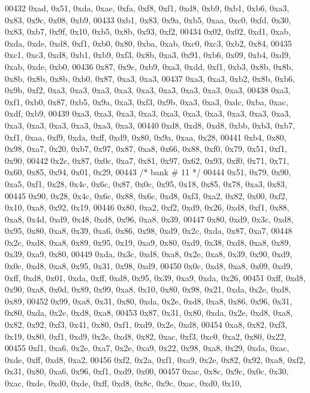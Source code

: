 \begin{DoxyCode}
00432     0xad, 0x51, 0xda, 0xae, 0xfa, 0xf8, 0xf1, 0xd8, 0xb9, 0xb1, 0xb6, 0xa3, 0x83, 0x9c, 0x08, 0xb9,
00433     0xb1, 0x83, 0x9a, 0xb5, 0xaa, 0xc0, 0xfd, 0x30, 0x83, 0xb7, 0x9f, 0x10, 0xb5, 0x8b, 0x93, 0xf2,
00434     0x02, 0x02, 0xd1, 0xab, 0xda, 0xde, 0xd8, 0xf1, 0xb0, 0x80, 0xba, 0xab, 0xc0, 0xc3, 0xb2, 0x84,
00435     0xc1, 0xc3, 0xd8, 0xb1, 0xb9, 0xf3, 0x8b, 0xa3, 0x91, 0xb6, 0x09, 0xb4, 0xd9, 0xab, 0xde, 0xb0,
00436     0x87, 0x9c, 0xb9, 0xa3, 0xdd, 0xf1, 0xb3, 0x8b, 0x8b, 0x8b, 0x8b, 0x8b, 0xb0, 0x87, 0xa3, 0xa3,
00437     0xa3, 0xa3, 0xb2, 0x8b, 0xb6, 0x9b, 0xf2, 0xa3, 0xa3, 0xa3, 0xa3, 0xa3, 0xa3, 0xa3, 0xa3, 0xa3,
00438     0xa3, 0xf1, 0xb0, 0x87, 0xb5, 0x9a, 0xa3, 0xf3, 0x9b, 0xa3, 0xa3, 0xdc, 0xba, 0xac, 0xdf, 0xb9,
00439     0xa3, 0xa3, 0xa3, 0xa3, 0xa3, 0xa3, 0xa3, 0xa3, 0xa3, 0xa3, 0xa3, 0xa3, 0xa3, 0xa3, 0xa3, 0xa3,
00440     0xd8, 0xd8, 0xd8, 0xbb, 0xb3, 0xb7, 0xf1, 0xaa, 0xf9, 0xda, 0xff, 0xd9, 0x80, 0x9a, 0xaa, 0x28,
00441     0xb4, 0x80, 0x98, 0xa7, 0x20, 0xb7, 0x97, 0x87, 0xa8, 0x66, 0x88, 0xf0, 0x79, 0x51, 0xf1, 0x90,
00442     0x2c, 0x87, 0x0c, 0xa7, 0x81, 0x97, 0x62, 0x93, 0xf0, 0x71, 0x71, 0x60, 0x85, 0x94, 0x01, 0x29,
00443     \textcolor{comment}{/* bank # 11 */}
00444     0x51, 0x79, 0x90, 0xa5, 0xf1, 0x28, 0x4c, 0x6c, 0x87, 0x0c, 0x95, 0x18, 0x85, 0x78, 0xa3, 0x83,
00445     0x90, 0x28, 0x4c, 0x6c, 0x88, 0x6c, 0xd8, 0xf3, 0xa2, 0x82, 0x00, 0xf2, 0x10, 0xa8, 0x92, 0x19,
00446     0x80, 0xa2, 0xf2, 0xd9, 0x26, 0xd8, 0xf1, 0x88, 0xa8, 0x4d, 0xd9, 0x48, 0xd8, 0x96, 0xa8, 0x39,
00447     0x80, 0xd9, 0x3c, 0xd8, 0x95, 0x80, 0xa8, 0x39, 0xa6, 0x86, 0x98, 0xd9, 0x2c, 0xda, 0x87, 0xa7,
00448     0x2c, 0xd8, 0xa8, 0x89, 0x95, 0x19, 0xa9, 0x80, 0xd9, 0x38, 0xd8, 0xa8, 0x89, 0x39, 0xa9, 0x80,
00449     0xda, 0x3c, 0xd8, 0xa8, 0x2e, 0xa8, 0x39, 0x90, 0xd9, 0x0c, 0xd8, 0xa8, 0x95, 0x31, 0x98, 0xd9,
00450     0x0c, 0xd8, 0xa8, 0x09, 0xd9, 0xff, 0xd8, 0x01, 0xda, 0xff, 0xd8, 0x95, 0x39, 0xa9, 0xda, 0x26,
00451     0xff, 0xd8, 0x90, 0xa8, 0x0d, 0x89, 0x99, 0xa8, 0x10, 0x80, 0x98, 0x21, 0xda, 0x2e, 0xd8, 0x89,
00452     0x99, 0xa8, 0x31, 0x80, 0xda, 0x2e, 0xd8, 0xa8, 0x86, 0x96, 0x31, 0x80, 0xda, 0x2e, 0xd8, 0xa8,
00453     0x87, 0x31, 0x80, 0xda, 0x2e, 0xd8, 0xa8, 0x82, 0x92, 0xf3, 0x41, 0x80, 0xf1, 0xd9, 0x2e, 0xd8,
00454     0xa8, 0x82, 0xf3, 0x19, 0x80, 0xf1, 0xd9, 0x2e, 0xd8, 0x82, 0xac, 0xf3, 0xc0, 0xa2, 0x80, 0x22,
00455     0xf1, 0xa6, 0x2e, 0xa7, 0x2e, 0xa9, 0x22, 0x98, 0xa8, 0x29, 0xda, 0xac, 0xde, 0xff, 0xd8, 0xa2,
00456     0xf2, 0x2a, 0xf1, 0xa9, 0x2e, 0x82, 0x92, 0xa8, 0xf2, 0x31, 0x80, 0xa6, 0x96, 0xf1, 0xd9, 0x00,
00457     0xac, 0x8c, 0x9c, 0x0c, 0x30, 0xac, 0xde, 0xd0, 0xde, 0xff, 0xd8, 0x8c, 0x9c, 0xac, 0xd0, 0x10,

\end{DoxyCode}
